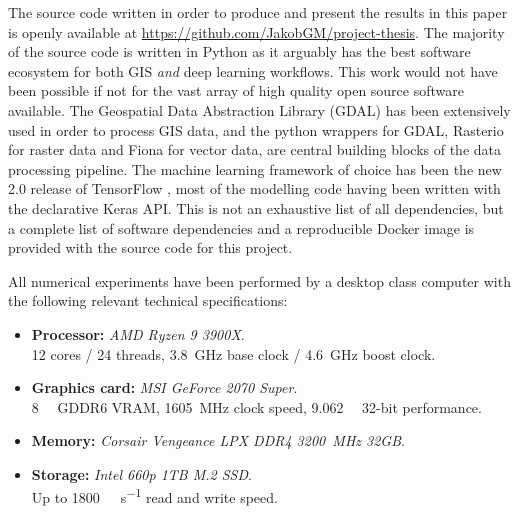 The source code written in order to produce and present the results in this paper is openly available at \url{https://github.com/JakobGM/project-thesis}.
The majority of the source code is written in Python as it arguably has the best software ecosystem for both GIS \emph{and} deep learning workflows.
This work would not have been possible if not for the vast array of high quality open source software available.
The Geospatial Data Abstraction Library (GDAL) \cite{dep:gdal} has been extensively used in order to process GIS data, and the python wrappers for GDAL, Rasterio \cite{dep:rasterio} for raster data and Fiona \cite{dep:fiona} for vector data, are central building blocks of the data processing pipeline.
The machine learning framework of choice has been the new 2.0 release of TensorFlow \cite{dep:tensorflow}, most of the modelling code having been written with the declarative Keras API.
This is not an exhaustive list of all dependencies, but a complete list of software dependencies and a reproducible Docker \cite{dep:docker} image is provided with the source code for this project.


All numerical experiments have been performed by a desktop class computer with the following relevant technical specifications:

\begin{itemize}[nosep]
  \item \textbf{Processor:} \textit{AMD Ryzen 9 3900X}. \\
    12 cores / 24 threads, \SI{3.8}{\giga\hertz} base clock / \SI{4.6}{\giga\hertz} boost clock.
  \item \textbf{Graphics card:} \textit{MSI GeForce 2070 Super}. \\
    \SI{8}{\giga\byte} GDDR6 VRAM, \SI{1605}{\mega\hertz} clock speed, \SI{9.062}{\tera\flops} 32-bit performance.
  \item \textbf{Memory:} \textit{Corsair Vengeance LPX DDR4 \SI{3200}{\mega\hertz} 32GB}.
  \item \textbf{Storage:} \textit{Intel 660p 1TB M.2 SSD}. \\
    Up to \SI{1800}{\mega\byte\per\second} read and write speed.
\end{itemize}

